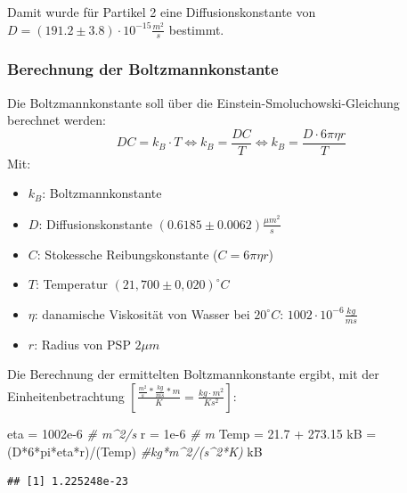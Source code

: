 \documentclass[
  9pt,
]{article}
\newenvironment{Shaded}{\begin{snugshade}}{\end{snugshade}}
\newcommand{\CommentTok}[1]{\textcolor[rgb]{0.56,0.35,0.01}{\textit{#1}}}
\newcommand{\DecValTok}[1]{\textcolor[rgb]{0.00,0.00,0.81}{#1}}
\newcommand{\FloatTok}[1]{\textcolor[rgb]{0.00,0.00,0.81}{#1}}
\newcommand{\NormalTok}[1]{#1}
\newcommand{\OtherTok}[1]{\textcolor[rgb]{0.56,0.35,0.01}{#1}}
\newcommand{\SpecialCharTok}[1]{\textcolor[rgb]{0.00,0.00,0.00}{#1}}
\begin{document}
Damit wurde für Partikel 2 eine Diffusionskonstante von
\(D=(191.2 \pm 3.8)\cdot 10^{-15} \frac{m^2}{s}\) bestimmt.

\hypertarget{berechnung-der-boltzmannkonstante}{%
\subsubsection{Berechnung der
Boltzmannkonstante}\label{berechnung-der-boltzmannkonstante}}

Die Boltzmannkonstante soll über die Einstein-Smoluchowski-Gleichung
berechnet werden:
\[DC = k_B\cdot T \Leftrightarrow k_B = \frac{DC}{T} \Leftrightarrow k_B = \frac{D\cdot 6\pi \eta r}{T}\]
Mit:

\begin{itemize}
  \item $k_B$: Boltzmannkonstante
  \item $D$: Diffusionskonstante $(0.6185 \pm 0.0062 )\frac{\mu m^2}{s}$
  \item $C$: Stokessche Reibungskonstante ($C=6\pi \eta r$)
  \item $T$: Temperatur $(21,700 \pm 0,020)^{\circ}C$
  \item $\eta$: danamische Viskosität von Wasser bei $20^{\circ}C$: $1002\cdot 10^{-6} \frac{kg}{ms}$
  \item $r$: Radius von PSP $2\mu m$
\end{itemize}

Die Berechnung der ermittelten Boltzmannkonstante ergibt, mit der
Einheitenbetrachtung
\([\frac{\frac{m^2}{s}*\frac{kg}{ms}*m}{K} = \frac{kg\cdot m^2}{Ks^2}]\):

\begin{Shaded}
\begin{Highlighting}[]
\NormalTok{eta }\OtherTok{=} \FloatTok{1002e{-}6} \CommentTok{\# m\^{}2/s}
\NormalTok{r }\OtherTok{=} \FloatTok{1e{-}6} \CommentTok{\# m }
\NormalTok{Temp }\OtherTok{=} \FloatTok{21.7} \SpecialCharTok{+} \FloatTok{273.15}
\NormalTok{kB }\OtherTok{=}\NormalTok{ (D}\SpecialCharTok{*}\DecValTok{6}\SpecialCharTok{*}\NormalTok{pi}\SpecialCharTok{*}\NormalTok{eta}\SpecialCharTok{*}\NormalTok{r)}\SpecialCharTok{/}\NormalTok{(Temp) }\CommentTok{\#kg*m\^{}2/(s\^{}2*K)}
\NormalTok{kB}
\end{Highlighting}
\end{Shaded}

\begin{verbatim}
## [1] 1.225248e-23
\end{verbatim}
\end{document}
